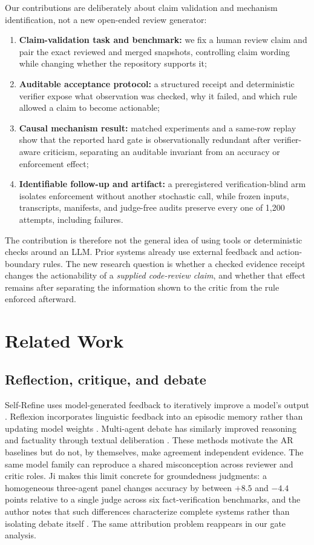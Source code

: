 \documentclass[acmsmall,screen,review,anonymous]{acmart}
\begin{document}
Our contributions are deliberately about claim validation and mechanism identification, not a new open-ended review generator:
\begin{enumerate}
  \item \textbf{Claim-validation task and benchmark:} we fix a human review claim and pair the exact reviewed and merged snapshots, controlling claim wording while changing whether the repository supports it;
  \item \textbf{Auditable acceptance protocol:} a structured receipt and deterministic verifier expose what observation was checked, why it failed, and which rule allowed a claim to become actionable;
  \item \textbf{Causal mechanism result:} matched experiments and a same-row replay show that the reported hard gate is observationally redundant after verifier-aware criticism, separating an auditable invariant from an accuracy or enforcement effect;
  \item \textbf{Identifiable follow-up and artifact:} a preregistered verification-blind arm isolates enforcement without another stochastic call, while frozen inputs, transcripts, manifests, and judge-free audits preserve every one of 1,200 attempts, including failures.
\end{enumerate}

The contribution is therefore not the general idea of using tools or deterministic checks around an LLM. Prior systems already use external feedback and action-boundary rules. The new research question is whether a checked evidence receipt changes the actionability of a \emph{supplied code-review claim}, and whether that effect remains after separating the information shown to the critic from the rule enforced afterward.

\section{Related Work}

\subsection{Reflection, critique, and debate}

Self-Refine uses model-generated feedback to iteratively improve a model's output \cite{selfrefine}. Reflexion incorporates linguistic feedback into an episodic memory rather than updating model weights \cite{reflexion}. Multi-agent debate has similarly improved reasoning and factuality through textual deliberation \cite{debate}. These methods motivate the AR baselines but do not, by themselves, make agreement independent evidence. The same model family can reproduce a shared misconception across reviewer and critic roles. Ji makes this limit concrete for groundedness judgments: a homogeneous three-agent panel changes accuracy by between $+8.5$ and $-4.4$ points relative to a single judge across six fact-verification benchmarks, and the author notes that such differences characterize complete systems rather than isolating debate itself \cite{more-debate}. The same attribution problem reappears in our gate analysis.
\end{document}
